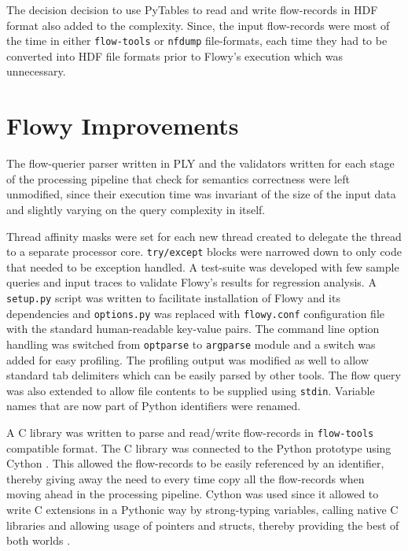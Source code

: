 The decision decision to use PyTables to read and write flow-records in
\ac{HDF} format also added to the complexity. Since, the input flow-records
were most of the time  in either
\texttt{flow-tools} or \texttt{nfdump} file-formats, each time they had to be
converted into \ac{HDF} file formats prior to Flowy's execution which was
unnecessary.

\section{Flowy Improvements}\label{sec:flowy-improvements}

The flow-querier parser written in \ac{PLY} and the validators written for
each stage of the processing pipeline that check for semantics correctness
were left unmodified, since their execution time was invariant of the size of
the input data and slightly varying on the query complexity in itself.

Thread affinity masks were set for each new thread created to delegate the
thread to a separate processor core. \texttt{try/except} blocks were narrowed
down to only code that needed to be exception handled. A test-suite was
developed with few sample queries and input traces to validate Flowy's results
for regression analysis. A \texttt{setup.py} script was written to facilitate
installation of 
Flowy and its dependencies and \texttt{options.py} was replaced with
\texttt{flowy.conf} configuration file with the standard human-readable
key-value pairs. The command line option handling was switched from
\texttt{optparse} to \texttt{argparse} module and a switch was added for easy
profiling. The profiling output was modified as well to allow standard tab
delimiters which can be easily parsed by other tools. The flow query was also
extended to allow file contents to be supplied using \texttt{stdin}. Variable
names that are now part of Python identifiers were renamed.

A C library was written to parse and read/write flow-records in
\texttt{flow-tools} compatible format. The C library was connected to the
Python prototype using Cython \cite{dseljebotn:2009}\cite{wilbers:2009}. This
allowed the flow-records to be easily referenced by an  identifier, thereby giving away the need to
every time copy all the flow-records when moving ahead in the processing
pipeline. Cython was used since it allowed to write C extensions in a Pythonic
way by strong-typing variables, calling native C libraries and allowing usage
of pointers and structs, thereby providing the best of both worlds
\cite{sbehnel:2011}.

